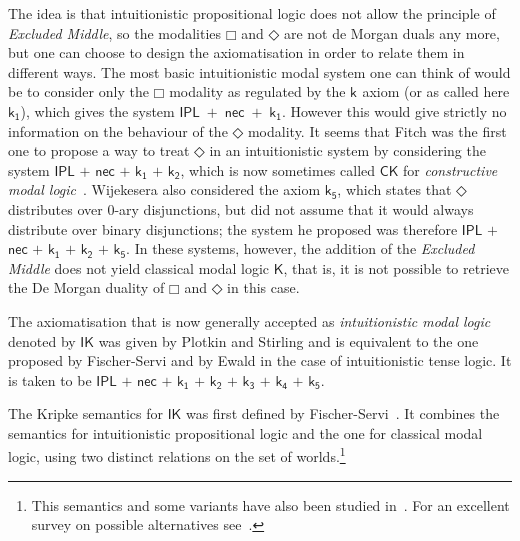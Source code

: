 \documentclass[a4paper]{article}
\theoremstyle{plain}
\theoremstyle{definition}
\newcommand*{\ax}[1]{\mathsf{#1}}
\newcommand*{\kax}[1][]{\ax{k_{#1}}}
\newcommand*{\IK}{\mathsf{IK}}
\newcommand*{\K}{\mathsf{K}}
\newcommand*{\BOX}{\mathord{\Box}}
\newcommand*{\DIA}{\mathord{\Diamond}}
\newcommand*{\rn}[1]  {\ensuremath{\mathsf{#1}}}
\begin{document}
 The idea is that intuitionistic propositional logic does not allow the principle of \emph{Excluded Middle}, so the modalities $\BOX$ and $\DIA$ are not de Morgan duals any more, but one can choose to design the axiomatisation in order to relate them in different ways. The most basic intuitionistic modal system one can think of would be to consider only the $\BOX$ modality as regulated by the $\kax$ axiom (or as called here $\kax[1]$), which gives the system \hbox{$\rn{IPL}$ $\rn{+}$ $\rn{nec}$ $\rn{+}$ $\kax[1]$}. However this would give strictly no information on the behaviour of the $\DIA$ modality.
 It seems that Fitch \cite{fitch:pm48} was the first one to propose a way to treat $\DIA$ in an intuitionistic system by considering the system  $\rn{IPL}$ $\rn{+}$ $\rn{nec}$ $\rn{+}$ $\kax[1]$ $\rn{+}$ $\kax[2]$, which is now sometimes called $\rn{CK}$ for \emph{constructive modal logic}~\cite{bierman:depaiva:sl00,mendler:scheele:ic11}. Wijekesera \cite{wijesekera:apal90} also considered the axiom $\kax[5]$, which states that $\DIA$ distributes over 0-ary disjunctions, but did not assume that it would always distribute over binary disjunctions; the system he proposed was therefore  $\rn{IPL}$ $\rn{+}$ $\rn{nec}$ $\rn{+}$ $\kax[1]$ $\rn{+}$ $\kax[2]$  $\rn{+}$ $\kax[5]$. In these systems, however, the addition of the \emph{Excluded Middle} does not yield classical modal logic $\K$, that is, it is not possible to retrieve the De Morgan duality of $\BOX$ and $\DIA$ in this case.
 
 The axiomatisation that is now generally accepted as \emph{intuitionistic modal logic} denoted by $\IK$ was given by Plotkin and Stirling \cite{plotkin:stirling:86} and is equivalent to the one proposed by Fischer-Servi \cite{fischer-servi:84} and by Ewald \cite{ewald:jsl86} in the case of intuitionistic tense logic. It is taken to be    $\rn{IPL}$ $\rn{+}$ $\rn{nec}$ $\rn{+}$ $\kax[1]$ $\rn{+}$ $\kax[2]$ $\rn{+}$ $\kax[3]$ $\rn{+}$ $\kax[4]$  $\rn{+}$ $\kax[5]$.
 
 
 The Kripke semantics for $\IK$ was first defined by Fischer-Servi~\cite{fischer-servi:84}.
 It combines the semantics for intuitionistic propositional logic and the one for classical modal logic, using two distinct relations on the set of worlds.\footnote{This semantics and some variants have also been studied in~\cite{bovzic1984models}. For an excellent survey on possible alternatives see~\cite{simpson:phd}.} 
 
\end{document}

